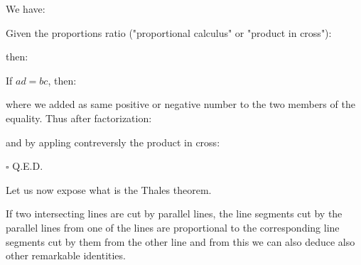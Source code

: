 	\begin{lemma}
	We have:
	
	\end{lemma}
	\begin{dem}
	Given the proportions ratio ("proportional calculus" or "product in cross"):
	
	then:
	
	If $ad=bc$, then:
	
	where we added as same positive or negative number to the two members of the equality. Thus after factorization:
	
	and by appling contreversly the product in cross:
	
	\begin{flushright}
		$\square$  Q.E.D.
	\end{flushright}
	\end{dem}
	Let us now expose what is the Thales theorem.
	\begin{theorem}
	 If two intersecting lines are cut by parallel lines, the line segments cut by the parallel lines from one of the lines are proportional to the corresponding line segments cut by them from the other line and from this we can also deduce also other remarkable identities.
	\end{theorem}
